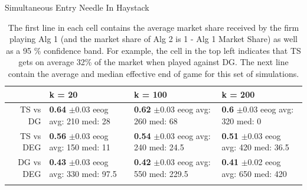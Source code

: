 \documentclass{article}
\theoremstyle{definition}
\begin{document}
\begin{table}[ht]
\centering
\caption{Simultaneous Entry Needle In Haystack} 
\begin{tabular}{rlll}
  \hline
 & k = 20 & k = 100 & k = 200 \\ 
  \hline
TS vs DG & \makecell{\textbf{0.64} $\pm$0.03\\ eeog \\ avg: 210\\ med: 28} & \makecell{\textbf{0.62} $\pm$0.03\\ eeog \\ avg: 260\\ med: 68} & \makecell{\textbf{0.6} $\pm$0.03\\ eeog \\ avg: 320\\ med: 0} \\ 
  TS vs DEG & \makecell{\textbf{0.56} $\pm$0.03\\ eeog \\ avg: 150\\ med: 11} & \makecell{\textbf{0.54} $\pm$0.03\\ eeog \\ avg: 240\\ med: 24.5} & \makecell{\textbf{0.51} $\pm$0.03\\ eeog \\ avg: 420\\ med: 36.5} \\ 
  DG vs DEG & \makecell{\textbf{0.43} $\pm$0.03\\ eeog \\ avg: 330\\ med: 97.5} & \makecell{\textbf{0.42} $\pm$0.03\\ eeog \\ avg: 550\\ med: 229.5} & \makecell{\textbf{0.41} $\pm$0.02\\ eeog \\ avg: 650\\ med: 420} \\ 
   \hline
   \label{hm_nih}
\end{tabular}
\caption*{\tiny{The first line in each cell contains the average market share received by the firm playing Alg 1 (and the market share of Alg 2 is 1 - Alg 1 Market Share) as well as a 95 \% confidence band. For example, the cell in the top left indicates that TS gets on average 32\% of the market when played against DG. The next line contain the average and median effective end of game for this set of simulations.}}
\end{table}
\end{document}
